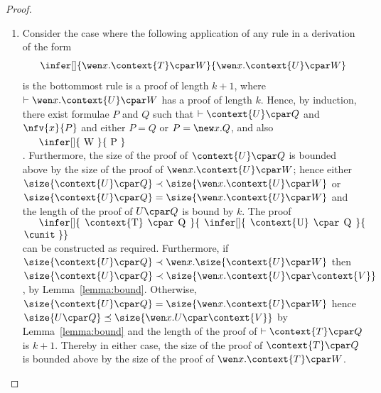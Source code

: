 \documentclass[UKenglish,acmsmall,authorversion]{acmart}
\theoremstyle{plain}
\begin{document}
{\begin{proof}
\begin{enumerate}[label=\textbf{\Alph*},ref=\Alph*,leftmargin=*]
\begin{enumerate}[label*=\textbf{.\arabic*}]
{Alternatively, the bottommost rule may appear inside the context of principal formula without affecting the root connective of the principal formula. 
%
Consider the case where \textit{seq} is the principal formula.
Assume that the following application of any rule is the bottommost rule in a proof
$
\infer[]{
\left( \context{T} \cseq V \right) \cpar W 
}{
 \left( \context{U} \cseq V \right) \cpar W
}
$
such that $\vdash \left( \context{U} \cseq V \right) \cpar W$ has a proof of length $n$. 
Hence by induction, there exist $n$-ary killing context $\tcontext{}$ and formulae $P_i$ and $Q_i$ such that $\vdash \context{U} \cpar P_i$ and $\vdash V \cpar Q_i$ hold and have a proof no longer than $n$, for $1 \leq i \leq n$, and also 
$
\infer[]{
W
}{
 \tcontext{ P_1 \cseq Q_1, \ldots, P_n \cseq Q_n }
}
$.
Hence we can construct the following proof of length no longer than $n+1$, for all $i$, as required:
$
\infer[]{
\context{T} \cpar P_i
}{
\infer[]{
   \context{U} \cpar P_i 
}{
 \cunit
}}
$.
}

\item Consider the case where the following application of any rule in a derivation of the form 
\[
\infer[]{
\wen x. \context{T} \cpar W
}{
 \wen x. \context{U} \cpar W
}
\]
is the bottommost rule is a proof of length $k+1$, where $\vdash \wen x. \context{U} \cpar W$ has a proof of length $k$.
Hence, by induction, there exist formulae $P$ and $Q$ such that $\vdash \context{U} \cpar Q$ and $\nfv{x}{P}$ and either $P = Q$ or $P = \new x. Q$, and also
$
\vcenter{
\infer[]{
W
}{
P
}}
$.
Furthermore, the size of the proof of $\context{U} \cpar Q$ is bounded above by the size of the proof of $\wen x. \context{U} \cpar W$; hence either $\size{\context{U} \cpar Q} \prec \size{\wen x. \context{U} \cpar W}$ or $\size{\context{U} \cpar Q} = \size{\wen x. \context{U} \cpar W }$ and the length of the proof of $U \cpar Q$ is bound by $k$.
%
The proof 
$
\vcenter{
\infer[]{
\context{T} \cpar Q
}{
\infer[]{
 \context{U} \cpar Q 
}{
   \cunit
}}}
$ can be constructed as required.
Furthermore, if $\size{\context{U} \cpar Q} \prec \wen x. \size{\context{U} \cpar W}$ then $\size{\context{U} \cpar Q} \prec \size{\wen x. \context{U} \cpar \context{ V }}$, by Lemma~\ref{lemma:bound}. Otherwise, $\size{\context{U} \cpar Q} = \size{\wen x. \context{U} \cpar W }$
hence $\size{U \cpar Q} \preceq \size{\wen x. U \cpar \context{ V }}$ by Lemma~\ref{lemma:bound} and the length of the proof of $\vdash \context{T} \cpar Q$ is $k+1$.
Thereby in either case, the size of the proof of $\context{T} \cpar Q$ is bounded above by the size of the proof of $\wen x. \context{T} \cpar W$.
\end{enumerate}


\end{enumerate}
\end{proof}}
\end{document}
